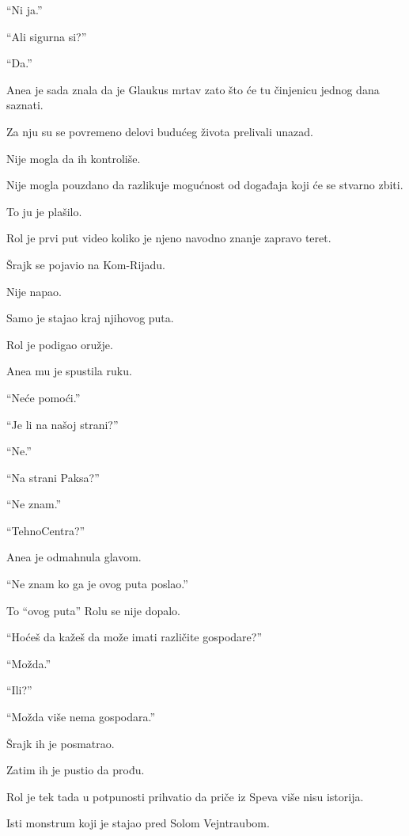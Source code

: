 ``Ni ja.''

``Ali sigurna si?''

``Da.''

\bigskip

Anea je sada znala da je Glaukus mrtav zato što će tu činjenicu jednog dana saznati.

Za nju su se povremeno delovi budućeg života prelivali unazad.

Nije mogla da ih kontroliše.

Nije mogla pouzdano da razlikuje mogućnost od događaja koji će se stvarno zbiti.

\bigskip

To ju je plašilo.

Rol je prvi put video koliko je njeno navodno znanje zapravo teret.

\bigskip

Šrajk se pojavio na Kom-Rijadu.

Nije napao.

Samo je stajao kraj njihovog puta.

\bigskip

Rol je podigao oružje.

Anea mu je spustila ruku.

``Neće pomoći.''

``Je li na našoj strani?''

``Ne.''

``Na strani Paksa?''

``Ne znam.''

``TehnoCentra?''

Anea je odmahnula glavom.

``Ne znam ko ga je ovog puta poslao.''

\bigskip

To ``ovog puta'' Rolu se nije dopalo.

``Hoćeš da kažeš da može imati različite gospodare?''

``Možda.''

``Ili?''

``Možda više nema gospodara.''

\bigskip

Šrajk ih je posmatrao.

Zatim ih je pustio da prođu.

\bigskip

Rol je tek tada u potpunosti prihvatio da priče iz Speva više nisu istorija.

Isti monstrum koji je stajao pred Solom Vejntraubom.


